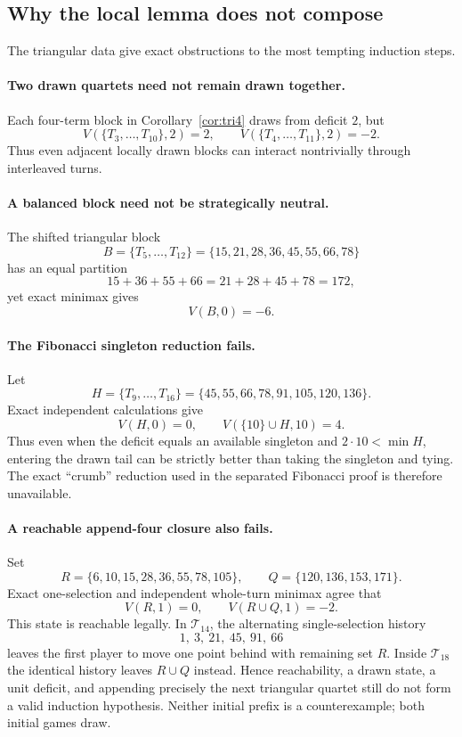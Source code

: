 \documentclass[11pt]{article}
\theoremstyle{remark}
\begin{document}
\subsection{Why the local lemma does not compose}
The triangular data give exact obstructions to the most tempting induction
steps.

\paragraph{Two drawn quartets need not remain drawn together.}
Each four-term block in Corollary~\ref{cor:tri4} draws from deficit $2$, but
\[
V(\{T_3,\ldots,T_{10}\},2)=2,
\qquad
V(\{T_4,\ldots,T_{11}\},2)=-2.
\]
Thus even adjacent locally drawn blocks can interact nontrivially through
interleaved turns.

\paragraph{A balanced block need not be strategically neutral.}
The shifted triangular block
\[
B=\{T_5,\ldots,T_{12}\}
 =\{15,21,28,36,45,55,66,78\}
\]
has an equal partition
\[
15+36+55+66=21+28+45+78=172,
\]
yet exact minimax gives
\[
V(B,0)=-6.
\]

\paragraph{The Fibonacci singleton reduction fails.}
Let
\[
H=\{T_9,\ldots,T_{16}\}
 =\{45,55,66,78,91,105,120,136\}.
\]
Exact independent calculations give
\[
V(H,0)=0,
\qquad
V(\{10\}\cup H,10)=4.
\]
Thus even when the deficit equals an available singleton and
$2\cdot10<\min H$, entering the drawn tail can be strictly better than taking
the singleton and tying.  The exact ``crumb'' reduction used in the separated
Fibonacci proof is therefore unavailable.

\paragraph{A reachable append-four closure also fails.}
Set
\[
R=\{6,10,15,28,36,55,78,105\},\qquad
Q=\{120,136,153,171\}.
\]
Exact one-selection and independent whole-turn minimax agree that
\[
\boxed{V(R,1)=0,\qquad V(R\cup Q,1)=-2.}
\]
This state is reachable legally.  In $\mathcal T_{14}$, the alternating
single-selection history
\[
1,\ 3,\ 21,\ 45,\ 91,\ 66
\]
leaves the first player to move one point behind with remaining set $R$.
Inside $\mathcal T_{18}$ the identical history leaves $R\cup Q$ instead.
Hence reachability, a drawn state, a unit deficit, and appending precisely the
next triangular quartet still do not form a valid induction hypothesis.
Neither initial prefix is a counterexample; both initial games draw.
\end{document}
